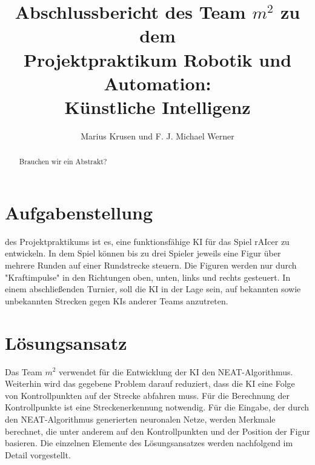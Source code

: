 \documentclass[11pt,final,journal,a4paper,towside,towcolumn]{IEEEtran}
\begin{document}
\begin{acronym}
\end{acronym}
	
\title{Abschlussbericht des Team $m^2$ zu dem \\Projektpraktikum Robotik und Automation:\\Künstliche Intelligenz}
\author{Marius Krusen und F. J. Michael Werner}
\maketitle

\begin{abstract}
Brauchen wir ein Abstrakt?
\end{abstract}

\section{Aufgabenstellung}
 des Projektpraktikums ist es, eine funktionsfähige  \ac{KI} für das Spiel rAIcer zu entwickeln. In dem Spiel können bis zu drei Spieler jeweils eine Figur über mehrere Runden auf einer Rundstrecke steuern. Die Figuren werden nur durch "Kraftimpulse" in den Richtungen oben, unten, links und rechts gesteuert. In einem abschließenden Turnier, soll die \ac{KI} in der Lage sein, auf bekannten sowie unbekannten Strecken gegen \acp{KI} anderer Teams anzutreten.

\section{Lösungsansatz}
Das Team $m^2$ verwendet für die Entwicklung der \ac{KI} den \ac{NEAT}-Algorithmus. Weiterhin wird das gegebene Problem darauf reduziert, dass die \ac{KI} eine Folge von Kontrollpunkten auf der Strecke abfahren muss. Für die Berechnung der Kontrollpunkte ist eine Streckenerkennung notwendig. Für die Eingabe, der durch den \ac{NEAT}-Algorithmus generierten neuronalen Netze, werden Merkmale berechnet, die unter anderem auf den Kontrollpunkten und der Position der Figur basieren. Die einzelnen Elemente des Lösungsansatzes werden nachfolgend im Detail vorgestellt.
\end{document}

